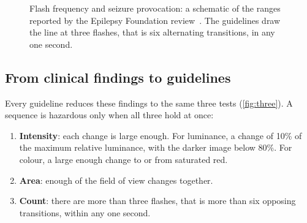 \documentclass[11pt,a4paper]{article}
\begin{document}
\begin{figure}[ht]
  \centering
  \caption{Flash frequency and seizure provocation: a schematic of the ranges reported by the Epilepsy Foundation review~\cite{fisher2005review}. The guidelines draw the line at three flashes, that is six alternating transitions, in any one second.}
  \label{fig:frequency}
\end{figure}

\subsection{From clinical findings to guidelines}

Every guideline reduces these findings to the same three tests (\cref{fig:three}). A sequence is hazardous only when all three hold at once:

\begin{enumerate}
  \item \textbf{Intensity}: each change is large enough. For luminance, a change of 10\% of the maximum relative luminance, with the darker image below 80\%. For colour, a large enough change to or from saturated red.
  \item \textbf{Area}: enough of the field of view changes together.
  \item \textbf{Count}: there are more than three flashes, that is more than six opposing transitions, within any one second.
\end{enumerate}
\end{document}
